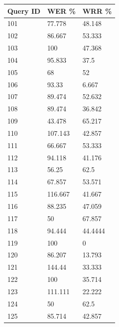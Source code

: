 \documentclass[jair, twoside,11pt,theapa]{article}
\begin{document}
\begin{table}[h!]
\begin{minipage}{.5\linewidth}
    \end{minipage}%
    \begin{minipage}{.5\linewidth} 
        \centering
        \begin{tabular}{|l|l|l|}
        \hline
        Query ID & WER \%    & WRR \%    \\ \hline
        101      & 77.778  & 48.148  \\ \hline
        102      & 86.667  & 53.333  \\ \hline
        103      & 100     & 47.368  \\ \hline
        104      & 95.833  & 37.5    \\ \hline
        105      & 68      & 52      \\ \hline
        106      & 93.33   & 6.667   \\ \hline
        107      & 89.474  & 52.632  \\ \hline
        108      & 89.474  & 36.842  \\ \hline
        109      & 43.478  & 65.217  \\ \hline
        110      & 107.143 & 42.857  \\ \hline
        111      & 66.667  & 53.333  \\ \hline
        112      & 94.118  & 41.176  \\ \hline
        113      & 56.25   & 62.5    \\ \hline
        114      & 67.857  & 53.571  \\ \hline
        115      & 116.667 & 41.667  \\ \hline
        116      & 88.235  & 47.059  \\ \hline
        117      & 50      & 67.857  \\ \hline
        118      & 94.444  & 44.4444 \\ \hline
        119      & 100     & 0       \\ \hline
        120      & 86.207  & 13.793  \\ \hline
        121      & 144.44  & 33.333  \\ \hline
        122      & 100     & 35.714  \\ \hline
        123      & 111.111 & 22.222  \\ \hline
        124      & 50      & 62.5    \\ \hline
        125      & 85.714  & 42.857  \\ \hline
        \end{tabular}
    \end{minipage}
\end{table}
\end{document}
